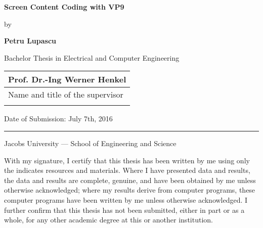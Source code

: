 \documentclass[a4paper,11pt,oneside]{article}
\newcommand{\myname}{Petru Lupascu}
\newcommand{\mytitle}{Screen Content Coding with VP9}
\newcommand{\mysupervisor}{Prof. Dr.-Ing Werner Henkel}
\begin{document}

  \thispagestyle{empty}

  \begin{flushright}
  \end{flushright}
  \vspace{20mm}
  \begin{center}
    \huge
    \textbf{\mytitle}
  \end{center}
  \vspace*{4mm}
  \begin{center}
   \Large by
  \end{center}
  \vspace*{4mm}
  \begin{center}
    \Large
    \textbf{\myname}
  \end{center}
  \vspace*{20mm}
  \begin{center}
    \large
    Bachelor Thesis in Electrical and Computer Engineering
  \end{center}
  \vfill
  \begin{flushright}
    \large
    \begin{tabular}{l}
      \mysupervisor \\
      \hline
      Name and title of the supervisor \\
      \\
    \end{tabular}
  \end{flushright}
  \vspace*{8mm}
  \begin{flushleft}
    \large
    Date of Submission: July 7th, 2016 \\
    \rule{\textwidth}{1pt}
  \end{flushleft}
  \begin{center}
    \Large Jacobs University --- School of Engineering and Science
  \end{center}

  \newpage
  \thispagestyle{empty}

  With my signature, I certify that this thesis has been written by me
  using only the indicates resources and materials. Where I have
  presented data and results, the data and results are complete,
  genuine, and have been obtained by me unless otherwise acknowledged;
  where my results derive from computer programs, these computer
  programs have been written by me unless otherwise acknowledged. I
  further confirm that this thesis has not been submitted, either in
  part or as a whole, for any other academic degree at this or another
  institution.
\end{document}
